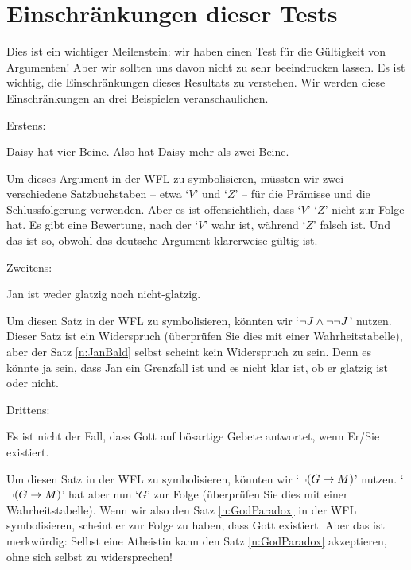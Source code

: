 \section{Einschränkungen dieser Tests}\label{s:ParadoxesOfMaterialConditional}
Dies ist ein wichtiger Meilenstein: wir haben einen Test für die Gültigkeit von Argumenten! Aber wir sollten uns davon nicht zu sehr beeindrucken lassen. Es ist wichtig, die Einschränkungen dieses Resultats zu verstehen. Wir werden diese Einschränkungen an drei Beispielen veranschaulichen.

Erstens: 
	\begin{earg}
		\item Daisy hat vier Beine. Also hat Daisy mehr als zwei Beine.
	\end{earg}
Um dieses Argument in der WFL zu symbolisieren, müssten wir zwei verschiedene Satzbuchstaben -- etwa `$V$' und `$Z$' -- für die Prämisse und die Schlussfolgerung verwenden. Aber es ist offensichtlich, dass `$V$' `$Z$' nicht zur Folge hat. Es gibt eine Bewertung, nach der `$V$' wahr ist, während `$Z$' falsch ist. Und das ist so, obwohl das deutsche Argument klarerweise gültig ist.

Zweitens:
	\begin{earg}
\setcounter{eargnum}{1}
		\item\label{n:JanBald} Jan ist weder glatzig noch nicht-glatzig.
	\end{earg}
Um diesen Satz in der WFL zu symbolisieren, könnten wir `$\neg J \wedge \neg \neg J$' nutzen. Dieser Satz ist ein Widerspruch (überprüfen Sie dies mit einer Wahrheitstabelle), aber der Satz \ref{n:JanBald} selbst scheint kein Widerspruch zu sein. Denn es könnte ja sein, dass Jan ein Grenzfall ist und es nicht klar ist, ob er glatzig ist oder nicht.

Drittens:
	\begin{earg}
	\setcounter{eargnum}{2}	
	\item\label{n:GodParadox} Es ist nicht der Fall, dass Gott auf bösartige Gebete antwortet, wenn Er/Sie existiert.
	\end{earg}
Um diesen Satz in der WFL zu symbolisieren, könnten wir `$\neg (G \rightarrow M)$' nutzen. `$\neg (G \rightarrow M)$' hat aber nun `$G$' zur Folge (überprüfen Sie dies mit einer Wahrheitstabelle). Wenn wir also den Satz \ref{n:GodParadox} in der WFL symbolisieren, scheint er zur Folge zu haben, dass Gott existiert. Aber das ist merkwürdig: Selbst eine Atheistin kann den Satz \ref{n:GodParadox} akzeptieren, ohne sich selbst zu widersprechen!

